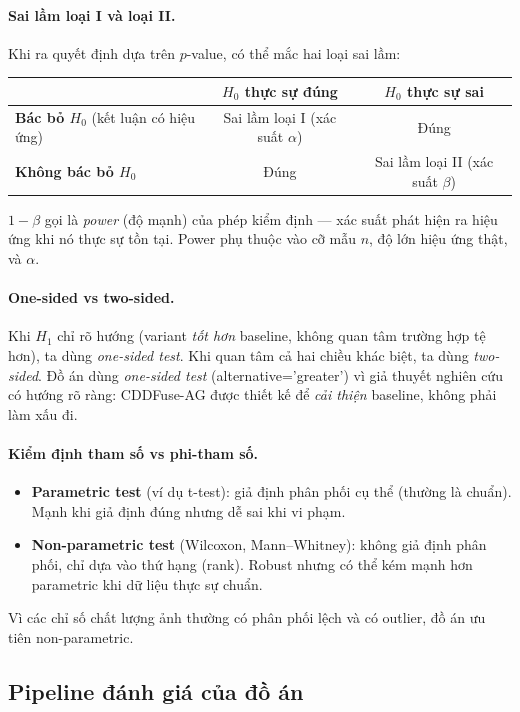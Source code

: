 \paragraph{Sai lầm loại I và loại II.}
Khi ra quyết định dựa trên $p$-value, có thể mắc hai loại sai lầm:
\begin{center}
\begin{tabular}{lcc}
\toprule
& \textbf{$H_0$ thực sự đúng} & \textbf{$H_0$ thực sự sai} \\
\midrule
\textbf{Bác bỏ $H_0$} (kết luận có hiệu ứng) & Sai lầm loại I (xác suất $\alpha$) & Đúng \\
\textbf{Không bác bỏ $H_0$} & Đúng & Sai lầm loại II (xác suất $\beta$) \\
\bottomrule
\end{tabular}
\end{center}
$1 - \beta$ gọi là \emph{power} (độ mạnh) của phép kiểm định --- xác suất phát hiện ra hiệu ứng khi nó thực sự tồn tại. Power phụ thuộc vào cỡ mẫu $n$, độ lớn hiệu ứng thật, và $\alpha$.

\paragraph{One-sided vs two-sided.}
Khi $H_1$ chỉ rõ hướng (variant \emph{tốt hơn} baseline, không quan tâm trường hợp tệ hơn), ta dùng \emph{one-sided test}. Khi quan tâm cả hai chiều khác biệt, ta dùng \emph{two-sided}. Đồ án dùng \emph{one-sided test} (alternative='greater') vì giả thuyết nghiên cứu có hướng rõ ràng: CDDFuse-AG được thiết kế để \emph{cải thiện} baseline, không phải làm xấu đi.

\paragraph{Kiểm định tham số vs phi-tham số.}
\begin{itemize}\itemsep0pt
    \item \textbf{Parametric test} (ví dụ t-test): giả định phân phối cụ thể (thường là chuẩn). Mạnh khi giả định đúng nhưng dễ sai khi vi phạm.
    \item \textbf{Non-parametric test} (Wilcoxon, Mann--Whitney): không giả định phân phối, chỉ dựa vào thứ hạng (rank). Robust nhưng có thể kém mạnh hơn parametric khi dữ liệu thực sự chuẩn.
\end{itemize}
Vì các chỉ số chất lượng ảnh thường có phân phối lệch và có outlier, đồ án ưu tiên non-parametric.

\subsection{Pipeline đánh giá của đồ án}
\label{ssec:eval-pipeline}

